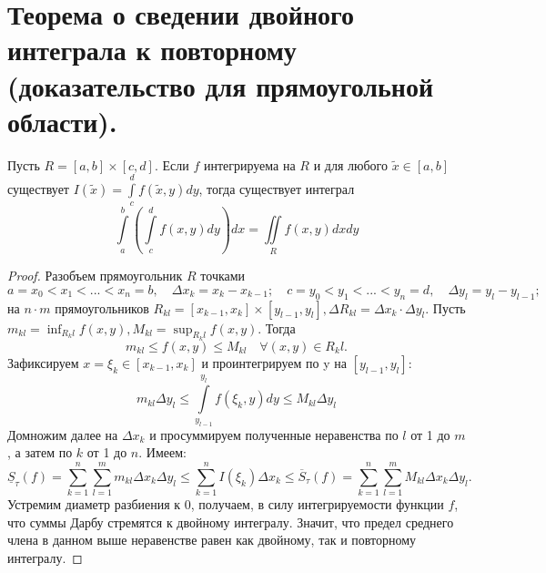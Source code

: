 \section{Теорема о сведении двойного интеграла к повторному (доказательство для прямоугольной области).}

\begin{theorem}
    Пусть $R = [a, b] \times [c, d]$.
    Если $f$ интегрируема на $R$ и для любого $\widetilde{x} \in [a, b]$ существует $I(\widetilde{x}) = \int \limits_c^d f(\widetilde{x}, y) dy$, тогда существует интеграл
    \[
        \int \limits_a^b \left(
            \int \limits_c^d f(x,y) dy
        \right) dx =
        \iint \limits_R f(x,y) dx dy
    \]
    \begin{proof}
        Разобъем прямоугольник $R$ точками
        \[
            a = x_0 < x_1 < ... < x_n = b,
            \quad
            \Delta x_k = x_k - x_{k-1};
            \quad
            c = y_0 < y_1 < ... < y_n = d,
            \quad
            \Delta y_l = y_l - y_{l-1};
        \] на $n \cdot m$ прямоугольников $R_{kl} = [x_{k-1}, x_k] \times [y_{l-1}, y_l], \Delta R_{kl} = \Delta x_k \cdot \Delta y_l$.
        Пусть $m_{kl} = \inf_{R_kl} f(x,y), M_{kl} = \sup_{R_kl} f(x,y)$. Тогда
        \[
            m_{kl} \leqslant f(x,y) \leqslant M_{kl}
            \quad
            \forall (x,y) \in R_kl.
        \]
        Зафиксируем $x = \xi_k \in [x_{k-1}, x_k]$ и проинтегрируем по y на $[y_{l-1}, y_l]$:
        \[
            m_{kl} \Delta y_l
            \leqslant
            \int \limits_{y_{l-1}}^{y_l} f(\xi_k, y) dy
            \leqslant
            M_{kl} \Delta y_l
        \]
        Домножим далее на $\Delta x_k$ и просуммируем полученные неравенства по $l$ от 1 до $m$, а затем по $k$ от 1 до $n$. Имеем:
        \[
            \underline{S}_\tau (f) =
            \sum_{k=1}^n \sum_{l=1}^m m_{kl} \Delta x_k \Delta y_l
            \leqslant
            \sum_{k=1}^n I(\xi_k) \Delta x_k
            \leqslant
            \overline{S}_\tau (f) =
            \sum_{k=1}^n \sum_{l=1}^m M_{kl} \Delta x_k \Delta y_l.
        \]
        Устремим диаметр разбиения к 0, получаем, в силу интегрируемости функции $f$, что суммы Дарбу стремятся к двойному интегралу. Значит, что предел среднего члена в данном выше неравенстве равен как двойному, так и повторному интегралу. 
    \end{proof}
\end{theorem}